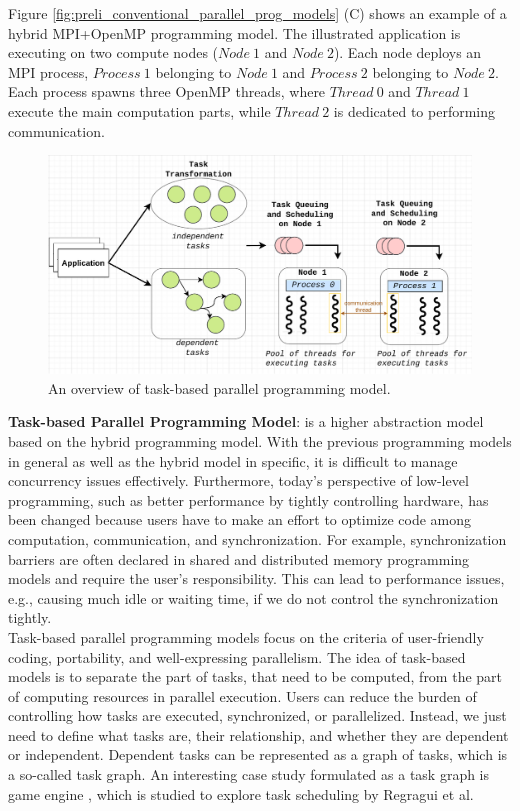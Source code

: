 Figure \ref{fig:preli_conventional_parallel_prog_models} (C) shows an example of a hybrid MPI+OpenMP programming model. The illustrated application is executing on two compute nodes ($Node\ 1$ and $Node\ 2$). Each node deploys an MPI process, $Process\ 1$ belonging to $Node\ 1$ and $Process\ 2$ belonging to $Node\ 2$. Each process spawns three OpenMP threads, where $Thread\ 0$ and $Thread\ 1$ execute the main computation parts, while $Thread\ 2$ is dedicated to performing communication.\\

\begin{figure}[t]
  \centering
  \includegraphics[scale=0.65]{./pictures/preliminaries/preli_task-based_prog_model.pdf}
	\caption{An overview of task-based parallel programming model.}
	\label{fig:preli_taskbased_programming_model}
\end{figure}

\noindent \textbf{Task-based Parallel Programming Model}: is a higher abstraction model based on the hybrid programming model. With the previous programming models in general as well as the hybrid model in specific, it is difficult to manage concurrency issues effectively. Furthermore, today's perspective of low-level programming, such as better performance by tightly controlling hardware, has been changed because users have to make an effort to optimize code among computation, communication, and synchronization. For example, synchronization barriers are often declared in shared and distributed memory programming models and require the user's responsibility. This can lead to performance issues, e.g., causing much idle or waiting time, if we do not control the synchronization tightly.\\

Task-based parallel programming models focus on the criteria of user-friendly coding, portability, and well-expressing parallelism.
The idea of task-based models is to separate the part of tasks, that need to be computed, from the part of computing resources in parallel execution. Users can reduce the burden of controlling how tasks are executed, synchronized, or parallelized. Instead, we just need to define what tasks are, their relationship, and whether they are dependent or independent. Dependent tasks can be represented as a graph of tasks, which is a so-called task graph. An interesting case study formulated as a task graph is game engine \cite{regragui2022schedgameengine}, which is studied to explore task scheduling by Regragui et al.\\


